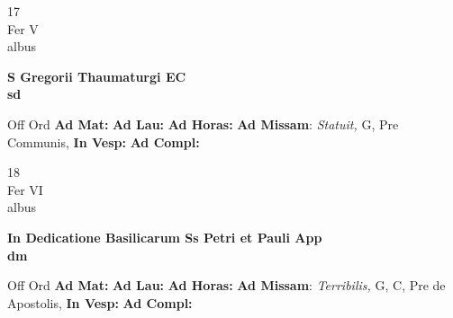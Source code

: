 \documentclass[10pt, openany]{book}
\begin{document}
        \begin{center}
            \begin{minipage}{3.5in}
                \vspace{2em}
                \begin{minipage}{0.5in}
                    {\Huge 17} \\
                    {\normalsize Fer V} \\
                    {\normalsize albus}
                \end{minipage}
                \begin{minipage}{3.0in}
                    \textbf{ \large S Gregorii Thaumaturgi EC \\
                    \textnormal{\normalsize sd}} \\ 
                \end{minipage}
                \begin{justify}Off Ord
                    \textbf{Ad Mat: }
                    \textbf{Ad Lau: }
                    \textbf{Ad Horas: }\textbf{Ad Missam}: \textit{Statuit,} G, Pre Communis,  
                    \textbf{In Vesp: }
                    \textbf{Ad Compl: }
                \end{justify}
            \end{minipage}
        \end{center}
    
        \begin{center}
            \begin{minipage}{3.5in}
                \vspace{2em}
                \begin{minipage}{0.5in}
                    {\Huge 18} \\
                    {\normalsize Fer VI} \\
                    {\normalsize albus}
                \end{minipage}
                \begin{minipage}{3.0in}
                    \textbf{ \large In Dedicatione Basilicarum Ss Petri et Pauli App \\
                    \textnormal{\normalsize dm}} \\ 
                \end{minipage}
                \begin{justify}Off Ord
                    \textbf{Ad Mat: }
                    \textbf{Ad Lau: }
                    \textbf{Ad Horas: }\textbf{Ad Missam}: \textit{Terribilis,} G, C, Pre de Apostolis,  
                    \textbf{In Vesp: }
                    \textbf{Ad Compl: }
                \end{justify}
            \end{minipage}
        \end{center}
    
\end{document}

